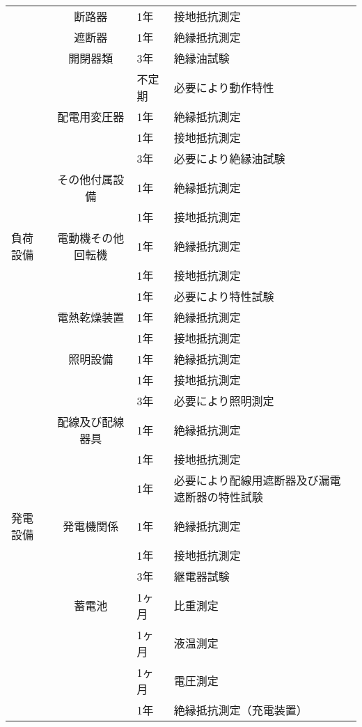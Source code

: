 \documentclass[10pt,a4paper,uplatex]{jsarticle}
\begin{document}
\begin{table}[b]
\begin{tabular}{|l|c|p{1cm}|p{10cm}|}
    &断路器         & 1年 & 接地抵抗測定  \\ 
    &遮断器         & 1年 & 絶縁抵抗測定  \\ 
    &開閉器類       & 3年 & 絶縁油試験  \\
    &              & 不定期 & 必要により動作特性  \\ \cline{2-4}
    &配電用変圧器   & 1年 & 絶縁抵抗測定  \\
    &              & 1年 & 接地抵抗測定  \\ 
    &              & 3年 & 必要により絶縁油試験 \\\cline{2-4}
    &その他付属設備   & 1年 & 絶縁抵抗測定  \\
    &              & 1年 & 接地抵抗測定  \\\cline{2-4}
    \hline 
負荷設備
    &電動機その他回転機& 1年 & 絶縁抵抗測定  \\
    &               & 1年 & 接地抵抗測定  \\
    &               & 1年 & 必要により特性試験  \\ \cline{2-4}
    &電熱乾燥装置     & 1年 & 絶縁抵抗測定  \\
    &               & 1年 & 接地抵抗測定  \\ \cline{2-4}
    &照明設備        & 1年 & 絶縁抵抗測定  \\
    &               & 1年 & 接地抵抗測定  \\
    &               & 3年 & 必要により照明測定  \\ \cline{2-4}
    &配線及び配線器具 & 1年 & 絶縁抵抗測定  \\
    &               & 1年 & 接地抵抗測定  \\
    &               & 1年 & 必要により配線用遮断器及び漏電遮断器の特性試験  \\ \cline{2-4}
    \hline  
発電設備
    &発電機関係     & 1年 & 絶縁抵抗測定  \\
    &               & 1年 & 接地抵抗測定  \\
    &              & 3年 & 継電器試験  \\ \cline{2-4}
    &蓄電池         & 1ヶ月 & 比重測定  \\
    &              & 1ヶ月 & 液温測定  \\
    &              & 1ヶ月 & 電圧測定  \\
    &              & 1年 & 絶縁抵抗測定（充電装置）\\\cline{2-4}\hline  
  \end{tabular}
\end{table}
\end{document}
